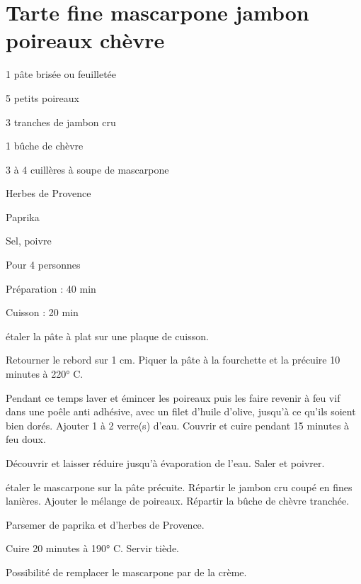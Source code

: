\section[\normalsize{Tarte fine mascarpone jambon poireaux ch\`evre}]{Tarte fine mascarpone jambon poireaux ch\`evre}

\begin{ingredients}
\item 1 p\^ate bris\'ee ou feuillet\'ee
\item 5 petits poireaux
\item 3 tranches de jambon cru
\item 1 bûche de ch\`evre
\item 3 \`a 4 cuill\`eres \`a soupe de mascarpone
\item Herbes de Provence
\item Paprika
\item Sel, poivre
\end{ingredients}
\begin{infos}
\item Pour 4 personnes
\item Préparation : 40 min
\item Cuisson : 20 min
\end{infos}
\begin{etapes}
\item \'etaler la p\^ate \`a plat sur une plaque de cuisson.
\item Retourner le rebord sur 1 cm. Piquer la p\^ate \`a la fourchette et la pr\'ecuire 10 minutes \`a 220° C.
\item Pendant ce temps laver et \'emincer les poireaux puis les faire revenir \`a feu vif dans une po\^ele anti adh\'esive, avec un filet d'huile d'olive, jusqu'\`a ce qu'ils soient bien dor\'es. Ajouter 1 \`a 2 verre(s) d'eau. Couvrir et cuire pendant 15 minutes \`a feu doux.
\item D\'ecouvrir et laisser r\'eduire jusqu'\`a \'evaporation de l'eau. Saler et poivrer.
\item \'etaler le mascarpone sur la p\^ate pr\'ecuite. R\'epartir le jambon cru coup\'e en fines lani\`eres. Ajouter le m\'elange de poireaux. R\'epartir la bûche de ch\`evre tranch\'ee. 
\item Parsemer de paprika et d'herbes de Provence.
\item Cuire 20 minutes \`a 190° C. Servir ti\`ede.
\end{etapes}
\begin{conseils}
Possibilit\'e de remplacer le mascarpone par de la cr\`eme.
\end{conseils}
